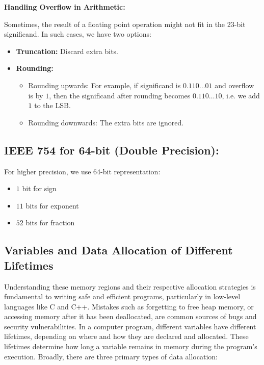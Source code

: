 \documentclass[12pt]{book}
\begin{document}
\begin{itemize}
\medskip
\textbf{Handling Overflow in Arithmetic:}

Sometimes, the result of a floating point operation might not fit in the 23-bit significand. In such cases, we have two options:
\begin{itemize}
    \item \textbf{Truncation:} Discard extra bits.
    \item \textbf{Rounding:}
    \begin{itemize}
        \item Rounding upwards: For example, if significand is $0.110\ldots 01$ and overflow is by $1$, then the significand after rounding becomes $0.110\ldots 10$, i.e. we add $1$ to the LSB.
        \item Rounding downwards: The extra bits are ignored.
    \end{itemize}
\end{itemize}

\medskip
\subsection*{IEEE 754 for 64-bit (Double Precision):}  
For higher precision, we use 64-bit representation:
\begin{itemize}
    \item $1$ bit for sign
    \item $11$ bits for exponent
    \item $52$ bits for fraction
\end{itemize}
\end{itemize}

\subsection{Variables and Data Allocation of Different Lifetimes}

Understanding these memory regions and their respective allocation strategies is fundamental to writing safe and efficient programs, particularly in low-level languages like C and C++. Mistakes such as forgetting to free heap memory, or accessing memory after it has been deallocated, are common sources of bugs and security vulnerabilities. 
In a computer program, different variables have different lifetimes, depending on where and how they are declared and allocated. These lifetimes determine how long a variable remains in memory during the program's execution. Broadly, there are three primary types of data allocation:
\end{document}
